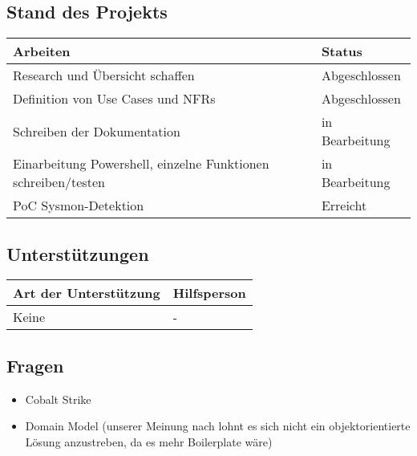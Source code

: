 \subsection*{Stand des Projekts}
\begin{table}[H]
    \centering
    \begin{tabular}{p{12cm} p{4cm}}
        \textbf{Arbeiten} & \textbf{Status} \\ \hline
        Research und Übersicht schaffen & Abgeschlossen \\ \hline
        Definition von Use Cases und NFRs & Abgeschlossen\\ \hline
        Schreiben der Dokumentation & in Bearbeitung \\ \hline
        Einarbeitung Powershell, einzelne Funktionen schreiben/testen & in Bearbeitung 
        \\ \hline
        PoC Sysmon-Detektion & Erreicht \\ \hline
    \end{tabular}
\end{table}

\vspace{1cm}

\subsection*{Unterstützungen}
\begin{table}[H]
    \centering
    \begin{tabular}{p{12cm} p{4cm}}
        \textbf{Art der Unterstützung} & \textbf{Hilfsperson} \\ \hline
        Keine & - \\ \hline
    \end{tabular}
\end{table}

\vspace{1cm}

\subsection*{Fragen}
\begin{itemize}
    \item Cobalt Strike
    \item Domain Model (unserer Meinung nach lohnt es sich nicht ein objektorientierte Lösung anzustreben, da es mehr Boilerplate wäre)
\end{itemize}

\vspace{1cm}

